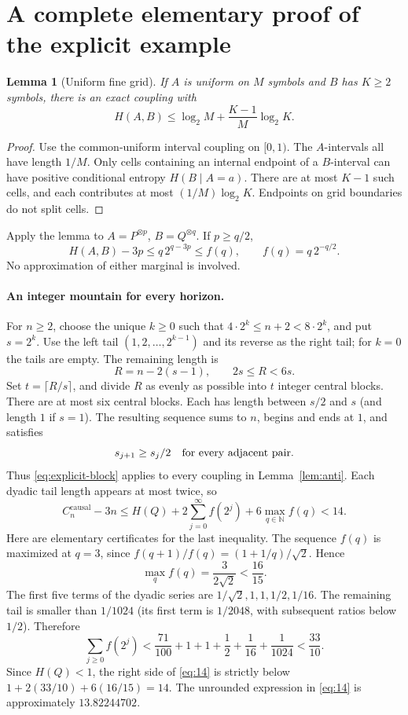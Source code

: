 \documentclass[11pt,a4paper]{article}
\newtheorem{lemma}[theorem]{Lemma}
\newcommand{\cc}{C^{\mathrm{causal}}}
\begin{document}
\section{A complete elementary proof of the explicit example}
\begin{lemma}[Uniform fine grid]\label{lem:grid}
If $A$ is uniform on $M$ symbols and $B$ has $K\ge2$ symbols, there is
an exact coupling with
\[
H(A,B)\le\log_2 M+\frac{K-1}{M}\log_2 K.
\]
\end{lemma}
\begin{proof}
Use the common-uniform interval coupling on $[0,1)$. The $A$-intervals
all have length $1/M$. Only cells containing an internal endpoint of a
$B$-interval can have positive conditional entropy $H(B\mid A=a)$.
There are at most $K-1$ such cells, and each contributes at most
$(1/M)\log_2 K$. Endpoints on grid boundaries do not split cells.
\end{proof}

Apply the lemma to $A=P^{\otimes p}$, $B=Q^{\otimes q}$. If $p\ge q/2$,
\begin{equation}\label{eq:explicit-block}
H(A,B)-3p\le q\,2^{q-3p}\le f(q),
\qquad f(q)=q\,2^{-q/2}.
\end{equation}
No approximation of either marginal is involved.

\paragraph{An integer mountain for every horizon.}
For $n\ge2$, choose the unique $k\ge0$ such that
$4\cdot2^k\le n+2<8\cdot2^k$, and put $s=2^k$.
Use the left tail $(1,2,\ldots,2^{k-1})$ and its reverse as the right
tail; for $k=0$ the tails are empty. The remaining length is
\[
R=n-2(s-1),\qquad 2s\le R<6s.
\]
Set $t=\lceil R/s\rceil$, and divide $R$ as evenly as possible into $t$
integer central blocks. There are at most six central blocks. Each has
length between $s/2$ and $s$ (and length $1$ if $s=1$).
The resulting sequence sums to $n$, begins and ends at $1$, and satisfies
\[
s_{j+1}\ge s_j/2\quad\hbox{for every adjacent pair.}
\]
Thus \eqref{eq:explicit-block} applies to every coupling in
Lemma~\ref{lem:anti}. Each dyadic tail length appears at most twice, so
\begin{equation}\label{eq:14}
\cc_n-3n\le H(Q)+2\sum_{j=0}^\infty f(2^j)
                        +6\max_{q\in\mathbb N}f(q)<14.
\end{equation}
Here are elementary certificates for the last inequality. The sequence
$f(q)$ is maximized at $q=3$, since
$f(q+1)/f(q)=(1+1/q)/\sqrt2$. Hence
\[
\max_q f(q)=\frac{3}{2\sqrt2}<\frac{16}{15}.
\]
The first five terms of the dyadic series are
$1/\sqrt2,1,1,1/2,1/16$. The remaining tail is smaller than $1/1024$
(its first term is $1/2048$, with subsequent ratios below $1/2$). Therefore
\[
\sum_{j\ge0}f(2^j)
<\frac{71}{100}+1+1+\frac12+\frac1{16}+\frac1{1024}
<\frac{33}{10}.
\]
Since $H(Q)<1$, the right side of \eqref{eq:14} is strictly below
$1+2(33/10)+6(16/15)=14$. The unrounded expression in
\eqref{eq:14} is approximately $13.82244702$.
\end{document}
